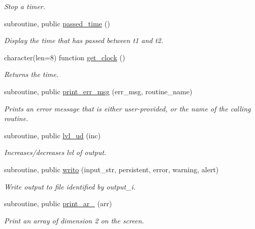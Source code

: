\begin{DoxyCompactItemize}
\begin{DoxyCompactList}\small\item\em Stop a timer. \end{DoxyCompactList}\item 
subroutine, public \hyperlink{namespacemessages_a34da9df28502ccd63e62674d51fe8de8}{passed\+\_\+time} ()
\begin{DoxyCompactList}\small\item\em Display the time that has passed between {\ttfamily t1} and {\ttfamily t2}. \end{DoxyCompactList}\item 
character(len=8) function \hyperlink{namespacemessages_a61fd0b51b5e37d58fdc993c01792a3fd}{get\+\_\+clock} ()
\begin{DoxyCompactList}\small\item\em Returns the time. \end{DoxyCompactList}\item 
subroutine, public \hyperlink{namespacemessages_a0da9248828de8b7480b99b47618e8310}{print\+\_\+err\+\_\+msg} (err\+\_\+msg, routine\+\_\+name)
\begin{DoxyCompactList}\small\item\em Prints an error message that is either user-\/provided, or the name of the calling routine. \end{DoxyCompactList}\item 
subroutine, public \hyperlink{namespacemessages_a6e6bfb084063e4cc91ee86e542043302}{lvl\+\_\+ud} (inc)
\begin{DoxyCompactList}\small\item\em Increases/decreases {\ttfamily lvl} of output. \end{DoxyCompactList}\item 
subroutine, public \hyperlink{namespacemessages_aa4a8d01563e92558e8a0875b075ec54c}{writo} (input\+\_\+str, persistent, error, warning, alert)
\begin{DoxyCompactList}\small\item\em Write output to file identified by {\ttfamily output\+\_\+i}. \end{DoxyCompactList}\item 
subroutine, public \hyperlink{namespacemessages_a80797cedef6112b8dccaeda431f0c610}{print\+\_\+ar\+\_} (arr)
\begin{DoxyCompactList}\small\item\em Print an array of dimension 2 on the screen. \end{DoxyCompactList}\item 

\end{DoxyCompactItemize}
